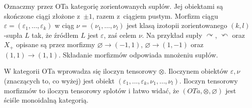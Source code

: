 \begin{proposition}
    Oznaczmy przez OTa kategorię zorientowanych supłów.
    Jej obiektami są skończone ciągi złożone z~$\pm 1$, razem z~ciągiem pustym.
    Morfizm ciągu $\varepsilon = (\varepsilon_1, \ldots, \varepsilon_k)$ w ciąg $\nu = (\nu_1, \ldots, \nu_l)$ jest klasą izotopii zorientowanego $(k, l)$-supła $L$ tak, że źródłem $L$ jest $\varepsilon$, zaś celem $\nu$. 
    Na przykład supły $\curvearrowright$, $\curvearrowleft$ oraz $X_+$ opisane są przez morfizmy $\varnothing \to (-1, 1)$, $\varnothing \to (1, -1)$ oraz $(1, 1) \to (1, 1)$.
    Składanie morfizmów odpowiada mnożeniu supłów.

    W kategorii OTa wprowadza się iloczyn tensorowy $\otimes$. Iloczynem obiektów $\varepsilon, \nu$ (znaczących to, co wyżej) jest obiekt $(\varepsilon_1, \ldots, \varepsilon_k, \nu_1, \ldots, \nu_l)$.
    Iloczyn tensorowy morfizmów to iloczyn tensorowy splotów i łatwo widać, że $(OTa, \otimes, \varnothing)$ jest ściśle monoidalną kategorią.


\end{proposition}
